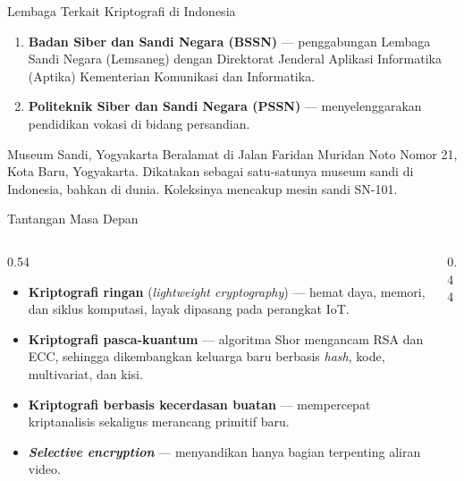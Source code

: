\documentclass[aspectratio=169,11pt]{beamer}
\begin{document}
\begin{frame}{Lembaga Terkait Kriptografi di Indonesia}
    \begin{enumerate}
        \item \textbf{Badan Siber dan Sandi Negara (BSSN)} --- penggabungan Lembaga
              Sandi Negara (Lemsaneg) dengan Direktorat Jenderal Aplikasi
              Informatika (Aptika) Kementerian Komunikasi dan Informatika.
        \item \textbf{Politeknik Siber dan Sandi Negara (PSSN)} ---
              menyelenggarakan pendidikan vokasi di bidang persandian.
    \end{enumerate}
    \vspace{0.3cm}
    \begin{exampleblock}{Museum Sandi, Yogyakarta}
        Beralamat di Jalan Faridan Muridan Noto Nomor 21, Kota Baru, Yogyakarta.
        Dikatakan sebagai satu-satunya museum sandi di Indonesia, bahkan di dunia.
        Koleksinya mencakup mesin sandi SN-101.
    \end{exampleblock}
\end{frame}

\begin{frame}{Tantangan Masa Depan}
    \begin{columns}[T,onlytextwidth]
        \begin{column}{0.54\textwidth}
            \begin{itemize}
                \item \textbf{Kriptografi ringan} (\textit{lightweight
                      cryptography}) --- hemat daya, memori, dan siklus komputasi,
                      layak dipasang pada perangkat IoT.
                \item \textbf{Kriptografi pasca-kuantum} --- algoritma Shor
                      mengancam RSA dan ECC, sehingga dikembangkan keluarga baru
                      berbasis \textit{hash}, kode, multivariat, dan kisi.
                \item \textbf{Kriptografi berbasis kecerdasan buatan} ---
                      mempercepat kriptanalisis sekaligus merancang primitif baru.
                \item \textbf{\textit{Selective encryption}} --- menyandikan hanya
                      bagian terpenting aliran video.
            \end{itemize}
        \end{column}
        \begin{column}{0.44\textwidth}
            \centering
        \end{column}
    \end{columns}
\end{frame}
\end{document}
